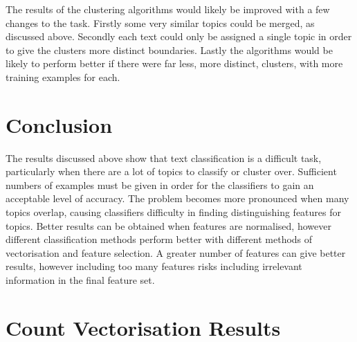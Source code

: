 \documentclass{article}
\begin{document}
The results of the clustering algorithms would likely be improved with a few changes to the task. Firstly some very similar topics could be merged, as discussed above. Secondly each text could only be assigned a single topic in order to give the clusters more distinct boundaries. Lastly the algorithms would be likely to perform better if there were far less, more distinct, clusters, with more training examples for each.

\section{Conclusion}
The results discussed above show that text classification is a difficult task, particularly when there are a lot of topics to classify or cluster over. Sufficient numbers of examples must be given in order for the classifiers to gain an acceptable level of accuracy. The problem becomes more pronounced when many topics overlap, causing classifiers difficulty in finding distinguishing features for topics. Better results can be obtained when features are normalised, however different classification methods perform better with different methods of vectorisation and feature selection. A greater number of features can give better results, however including too many features risks including irrelevant information in the final feature set.

\appendix

\clearpage
\section{Count Vectorisation Results}
\end{document}
